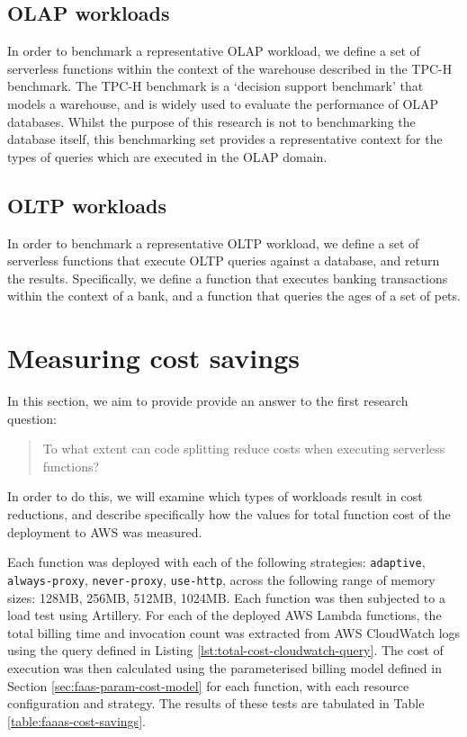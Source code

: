 \subsection{OLAP workloads}
In order to benchmark a representative OLAP workload, we define a set of serverless functions within the context of the warehouse described in the TPC-H benchmark. The TPC-H benchmark is a `decision support benchmark' that models a warehouse, and is widely used to evaluate the performance of OLAP databases. Whilst the purpose of this research is not to benchmarking the database itself, this benchmarking set provides a representative context for the types of queries which are executed in the OLAP domain.

\subsection{OLTP workloads}
In order to benchmark a representative OLTP workload, we define a set of serverless functions that execute OLTP queries against a database, and return the results. Specifically, we define a function that executes banking transactions within the context of a bank, and a function that queries the ages of a set of pets.

\section{Measuring cost savings}
In this section, we aim to provide provide an answer to the first research question: \blockquote{To what extent can code splitting reduce costs when executing serverless functions?}. In order to do this, we will examine which types of workloads result in cost reductions, and describe specifically how the values for total function cost of the \faaas{} deployment to AWS was measured.

Each function was deployed with each of the following strategies: \verb|adaptive|, \verb|always-proxy|, \verb|never-proxy|, \verb|use-http|, across the following range of memory sizes: 128MB, 256MB, 512MB, 1024MB. Each function was then subjected to a load test using Artillery\cite{artilleryArtilleryCloudscaleLoad}. For each of the deployed AWS Lambda functions, the total billing time and invocation count was extracted from AWS CloudWatch logs using the query defined in Listing \ref{lst:total-cost-cloudwatch-query}. The cost of execution was then calculated using the parameterised billing model defined in Section \ref{sec:faas-param-cost-model} for each function, with each resource configuration and strategy. The results of these tests are tabulated in Table \ref{table:faaas-cost-savings}.

